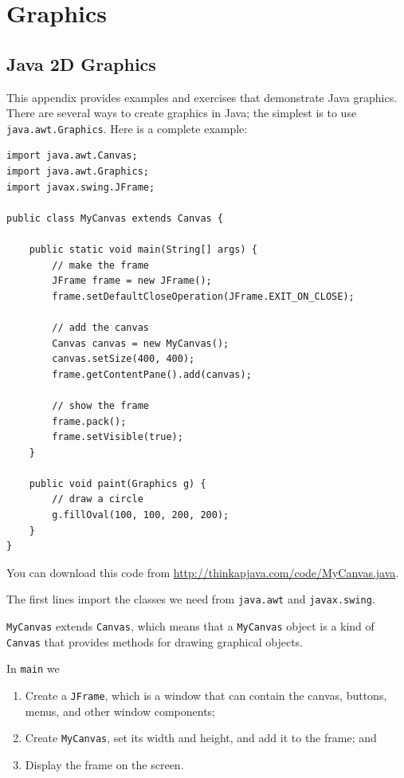 \chapter{Graphics}
\label{graphics}

\section{Java 2D Graphics}

This appendix provides examples and exercises that demonstrate Java
graphics.  There are several ways to create graphics in Java; the
simplest is to use {\tt java.awt.Graphics}.
Here is a complete example:

\begin{lstlisting}
import java.awt.Canvas;
import java.awt.Graphics;
import javax.swing.JFrame;

public class MyCanvas extends Canvas {

    public static void main(String[] args) {
        // make the frame
        JFrame frame = new JFrame();
        frame.setDefaultCloseOperation(JFrame.EXIT_ON_CLOSE);

        // add the canvas
        Canvas canvas = new MyCanvas();
        canvas.setSize(400, 400);
        frame.getContentPane().add(canvas);

        // show the frame
        frame.pack();
        frame.setVisible(true);
    }

    public void paint(Graphics g) {
        // draw a circle
        g.fillOval(100, 100, 200, 200);
    }
}
\end{lstlisting}
%
You can download this code from
\url{http://thinkapjava.com/code/MyCanvas.java}.

The first lines import the classes we need from {\tt java.awt}
and {\tt javax.swing}.

{\tt MyCanvas} extends {\tt Canvas}, which means that a
{\tt MyCanvas} object is a kind of {\tt Canvas} that provides
methods for drawing graphical objects.

In {\tt main} we

\begin{enumerate}

\item Create a {\tt JFrame}, which is a window that can contain the
  canvas, buttons, menus, and other window components;

\item Create {\tt MyCanvas}, set its width and height, and add it
  to the frame; and

\item Display the frame on the screen.

\end{enumerate}

